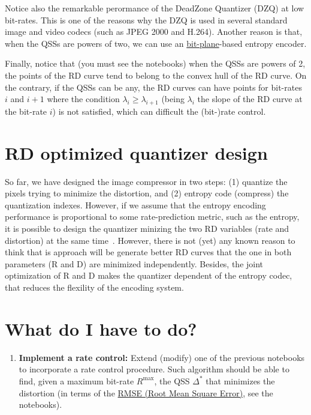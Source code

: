 Notice also the remarkable perormance of the DeadZone Quantizer (DZQ)
at low bit-rates. This is one of the reasons why the DZQ is used in
several standard image and video codecs (such as JPEG 2000 and
H.264). Another reason is that, when the QSSs are powers of two, we
can use an
\href{https://en.wikipedia.org/wiki/Bit_plane}{bit-plane}-based
entropy encoder.

Finally, notice that (you must see the notebooks) when the QSSs are
powers of 2, the points of the RD curve tend to belong to the convex
hull of the RD curve. On the contrary, if the QSSs can be any, the RD
curves can have points for bit-rates $i$ and $i+1$ where the condition
$\lambda_i\ge\lambda_{i+1}$ (being $\lambda_i$ the slope of the RD
curve at the bit-rate $i$) is not satisfied, which can difficult the
(bit-)rate control.

\section{RD optimized quantizer design}
So far, we have designed the image compressor in two steps: (1)
quantize the pixels trying to minimize the distortion, and (2) entropy
code (compress) the quantization indexes. However, if we assume that
the entropy encoding performance is proportional to some
rate-prediction metric, such as the entropy, it is possible to design
the quantizer minizing the two RD variables (rate and distortion) at
the same time~\cite{sayood2017introduction}. However, there is not
(yet) any known reason to think that is approach will be generate
better RD curves that the one in both parameters (R and D) are
minimized independently. Besides, the joint optimization of R and D
makes the quantizer dependent of the entropy codec, that reduces the
flexility of the encoding system.

\section{What do I have to do?}
\begin{enumerate}
\item \textbf{Implement a rate control:} Extend (modify) one of the
  previous notebooks to incorporate a rate control procedure. Such
  algorithm should be able to find, given a maximum bit-rate
  $R^\text{max}$, the QSS $\Delta^*$ that minimizes the distortion (in
  terms of the
  \href{https://en.wikipedia.org/wiki/Root-mean-square_deviation}{RMSE
    (Root Mean Square Error)}, see the notebooks).
\end{enumerate}

